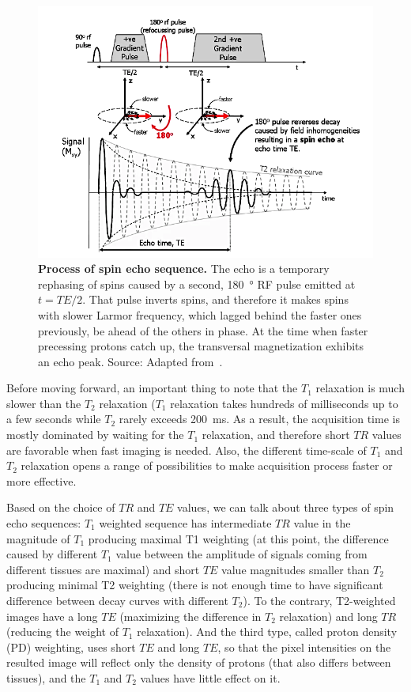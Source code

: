 \begin{figure}[thb]
    \centering
    \includegraphics[width=0.8\linewidth]{images/spin_echo.png}
    \caption{\textbf{Process of spin echo sequence.} The echo is a temporary rephasing of spins caused by a second, \SI{180}{\degree} RF pulse emitted at $t = TE/2$. That pulse inverts spins, and therefore it makes spins with slower Larmor frequency, which lagged behind the faster ones previously, be ahead of the others in phase. At the time when faster precessing protons catch up, the transversal magnetization exhibits an echo peak. Source: Adapted from~\cite{ridgway_cardiovascular_2010}.}
    \label{fig:spin_echo}
\end{figure}

Before moving forward, an important thing to note that the $T_1$ relaxation is much slower than the $T_2$ relaxation ($T_1$ relaxation takes hundreds of milliseconds up to a few seconds while $T_2$ rarely exceeds \SI{200}{\milli\second}. As a result, the acquisition time is mostly dominated by waiting for the $T_1$ relaxation, and therefore short $TR$ values are favorable when fast imaging is needed. Also, the different time-scale of $T_1$ and $T_2$ relaxation opens a range of possibilities to make acquisition process faster or more effective.

Based on the choice of $TR$ and $TE$ values, we can talk about three types of spin echo sequences: $T_1$ weighted sequence has intermediate $TR$ value in the magnitude of $T_1$ producing maximal T1 weighting (at this point, the difference caused by different $T_1$ value between the amplitude of signals coming from different tissues are maximal) and short $TE$ value magnitudes smaller than $T_2$ producing minimal T2 weighting (there is not enough time to have significant difference between decay curves with different $T_2$). To the contrary, T2-weighted images have a long $TE$ (maximizing the difference in $T_2$ relaxation) and long $TR$ (reducing the weight of $T_1$ relaxation). And the third type, called proton density (PD) weighting, uses short $TE$ and long $TE$, so that the pixel intensities on the resulted image will reflect only the density of protons (that also differs between tissues), and the $T_1$ and $T_2$ values have little effect on it.

